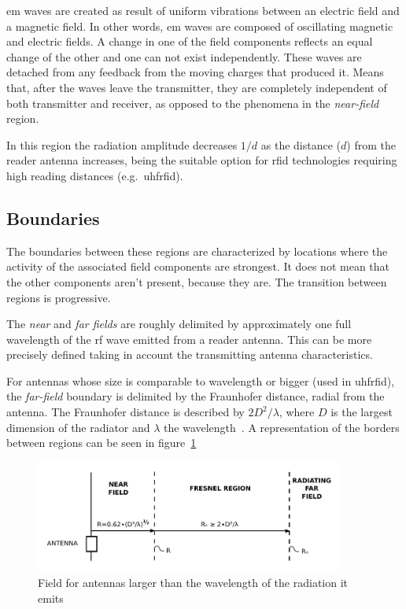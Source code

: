 \ac{em} waves are created as result of uniform vibrations between an electric field and a magnetic field. In other words, \ac{em} waves are composed of oscillating magnetic and electric fields. A change in one of the field components reflects an equal change of the other and one can not exist independently.
These waves are detached from any feedback from the moving charges that produced it. Means that, after the waves leave the transmitter, they are completely independent of both transmitter and receiver, as opposed to the phenomena in the \emph{near-field} region.

In this region the radiation amplitude decreases $1/d$ as the distance ($d$) from the reader antenna increases, being the suitable option for \ac{rfid} technologies requiring high reading distances (e.g.\ \ac{uhfrfid}).

\subsection{Boundaries}

The boundaries between these regions are characterized by locations where the activity of the associated field components are strongest. It does not mean that the other components aren't present, because they are. The transition between regions is progressive.

The \emph{near} and \emph{far fields} are roughly delimited by approximately one full wavelength of the \ac{rf} wave emitted from a reader antenna.
This can be more precisely defined taking in account the transmitting antenna characteristics.

For antennas whose size is comparable to wavelength or bigger (used in \ac{uhfrfid}), the \emph{far-field} boundary is delimited by the Fraunhofer distance, radial from the antenna. The Fraunhofer distance is described by $2D^2 / \lambda$, where $D$ is the largest dimension of the radiator and $\lambda$ the wavelength~\cite{balanisAntennaTheoryAnalysis2005}.
A representation of the borders between regions can be seen in figure~\ref{fig:fieldregionsbigantenna}

\begin{figure}[!ht]
    \centering
    \includegraphics[width=0.9\textwidth]{./figs/02-state-of-the-art/FarNearFields-USP-4998112.pdf}
    \caption{Field for antennas larger than the wavelength of the radiation it emits~\cite{zerodamageFarFieldsVectorized1991}} 
    \label{fig:fieldregionsbigantenna}
\end{figure}

